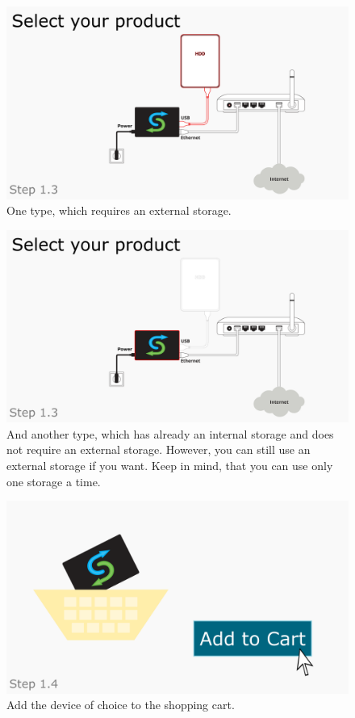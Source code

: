 \documentclass[a4paper,12pt]{article}
\begin{document}
\begin{figure}[htbp!]
	\centering
	\includegraphics[width=0.7\linewidth]{../frames/15.png}
	\caption{One type, which requires an external storage.}
	\label{fig:6}
\end{figure}

\begin{figure}[htbp!]
	\centering
	\includegraphics[width=0.7\linewidth]{../frames/16.png}
	\caption{And another type, which has already an internal storage and does not require an external storage. However, you can still use an external storage if you want. Keep in mind, that you can use only one storage a time.}
	\label{fig:7}
\end{figure}

\begin{figure}[htbp!]
	\centering
	\includegraphics[width=0.7\linewidth]{../frames/18.png}
	\caption{Add the device of choice to the shopping cart.}
	\label{fig:8}
\end{figure}
\end{document}
